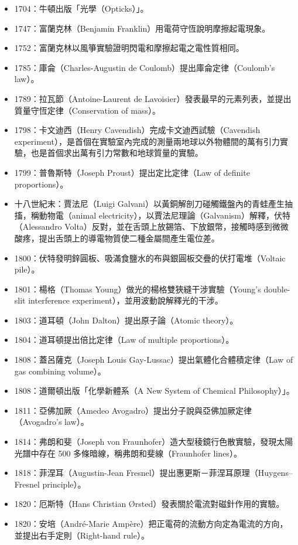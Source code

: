 \documentclass[a4paper,12pt]{article}
\begin{document}
\begin{itemize}
\item 1704：牛頓出版「光學（Opticks）」。
\item 1747：富蘭克林（Benjamin Franklin）用電荷守恆說明摩擦起電現象。
\item 1752：富蘭克林以風箏實驗證明閃電和摩擦起電之電性質相同。
\item 1785：庫侖（Charles-Augustin de Coulomb）提出庫侖定律（Coulomb's law）。
\item 1789：拉瓦節（Antoine-Laurent de Lavoisier）發表最早的元素列表，並提出質量守恆定律（Conservation of mass）。
\item 1798：卡文迪西（Henry Cavendish）完成卡文迪西試驗（Cavendish experiment），是首個在實驗室內完成的測量兩地球以外物體間的萬有引力實驗，也是首個求出萬有引力常數和地球質量的實驗。
\item 1799：普魯斯特（Joseph Proust）提出定比定律（Law of definite proportions）。
\item 十八世紀末：賈法尼（Luigi Galvani）以黃銅解剖刀碰觸鐵盤內的青蛙產生抽搐，稱動物電（animal electricity），以賈法尼理論（Galvanism）解釋，伏特（Alessandro Volta）反對，並在舌頭上放錫箔、下放銀幣，接觸時感到微微酸疼，提出舌頭上的導電物質使二種金屬間產生電位差。
\item 1800：伏特發明鋅圓板、吸滿食鹽水的布與銀圓板交疊的伏打電堆（Voltaic pile）。
\item 1801：楊格（Thomas Young）做光的楊格雙狹縫干涉實驗（Young's double-slit interference experiment），並用波動說解釋光的干涉。
\item 1803：道耳頓（John Dalton）提出原子論（Atomic theory）。
\item 1804：道耳頓提出倍比定律（Law of multiple proportions）。
\item 1808：蓋呂薩克（Joseph Louis Gay-Lussac）提出氣體化合體積定律（Law of gas combining volume）。
\item 1808：道爾頓出版「化學新體系（A New System of Chemical Philosophy）」。
\item 1811：亞佛加厥（Amedeo Avogadro）提出分子說與亞佛加厥定律（Avogadro's law）。
\item 1814：弗朗和斐（Joseph von Fraunhofer）造大型稜鏡行色散實驗，發現太陽光譜中存在 500 多條暗線，稱弗朗和斐線（Fraunhofer lines）。
\item 1818：菲涅耳（Augustin-Jean Fresnel）提出惠更斯－菲涅耳原理（Huygens–Fresnel principle）。
\item 1820：厄斯特（Hans Christian Ørsted）發表關於電流對磁針作用的實驗。
\item 1820：安培（André-Marie Ampère）把正電荷的流動方向定為電流的方向，並提出右手定則（Right-hand rule）。

\end{itemize}
\end{document}
